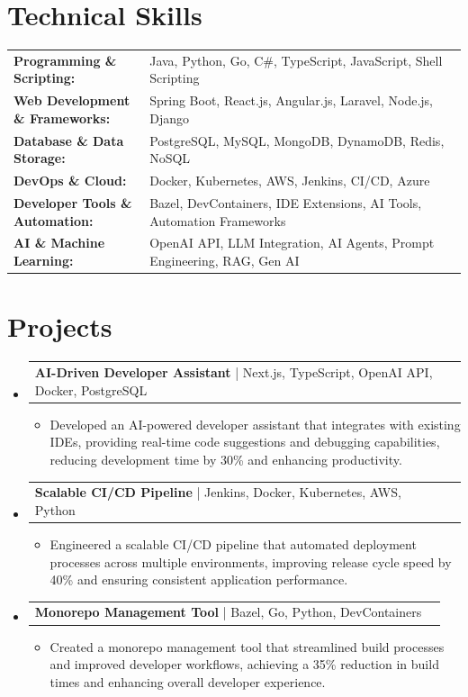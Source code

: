 \documentclass[letterpaper,10pt]{article}
\makeatletter
\newcommand{\resumeItem}[1]{
  \item{\fontsize{8pt}{9pt}\selectfont
    #1 \vspace{-3pt}
  }
}
\newcommand{\resumeProjectHeading}[2]{
    \item
    \begin{tabular*}{1.001\textwidth}{l@{\extracolsep{\fill}}r}
      \fontsize{8.5pt}{10pt}#1 & \textbf{\fontsize{8.5pt}{10pt} #2}\\
    \end{tabular*}\vspace{-7pt}
}
\newcommand{\resumeSubHeadingListStart}{\begin{itemize}[leftmargin=0pt, label={}]}
\newcommand{\resumeSubHeadingListEnd}{\end{itemize}}
\newcommand{\resumeItemListStart}{\begin{itemize}[leftmargin=*]}
\newcommand{\resumeItemListEnd}{\end{itemize}\vspace{-5pt}}
\makeatother
\begin{document}
\section{Technical Skills}
        \vspace{-14pt}
        \begin{table}[h]
            \fontsize{8pt}{9pt}\selectfont
            \begin{tabular}{p{0.3\linewidth} p{0.7\linewidth}}
                \textbf{Programming \& Scripting:} & Java, Python, Go, C\#, TypeScript, JavaScript, Shell Scripting \\
                \textbf{Web Development \& Frameworks:} & Spring Boot, React.js, Angular.js, Laravel, Node.js, Django \\
                \textbf{Database \& Data Storage:} & PostgreSQL, MySQL, MongoDB, DynamoDB, Redis, NoSQL \\
                \textbf{DevOps \& Cloud:} & Docker, Kubernetes, AWS, Jenkins, CI/CD, Azure \\
                \textbf{Developer Tools \& Automation:} & Bazel, DevContainers, IDE Extensions, AI Tools, Automation Frameworks \\
                \textbf{AI \& Machine Learning:} & OpenAI API, LLM Integration, AI Agents, Prompt Engineering, RAG, Gen AI \\
            \end{tabular}
        \end{table}
 \vspace{-18pt}

\section{Projects}
    \vspace{-5pt}
    \resumeSubHeadingListStart
          \resumeProjectHeading
            {\textbf{AI-Driven Developer Assistant} | Next.js, TypeScript, OpenAI API, Docker, PostgreSQL}{}
            \resumeItemListStart
                \resumeItem{Developed an AI-powered developer assistant that integrates with existing IDEs, providing real-time code suggestions and debugging capabilities, reducing development time by 30\% and enhancing productivity.}
            \resumeItemListEnd
        \vspace{-12pt}
    
        \resumeProjectHeading
            {\textbf{Scalable CI/CD Pipeline} | Jenkins, Docker, Kubernetes, AWS, Python}{}
        \resumeItemListStart
                \resumeItem{Engineered a scalable CI/CD pipeline that automated deployment processes across multiple environments, improving release cycle speed by 40\% and ensuring consistent application performance.}
        \resumeItemListEnd
      \vspace{-12pt}
      \resumeProjectHeading
        {\textbf{Monorepo Management Tool} | Bazel, Go, Python, DevContainers}{}
    \resumeItemListStart
            \resumeItem{Created a monorepo management tool that streamlined build processes and improved developer workflows, achieving a 35\% reduction in build times and enhancing overall developer experience.}
    \resumeItemListEnd
    \resumeSubHeadingListEnd
\end{document}
